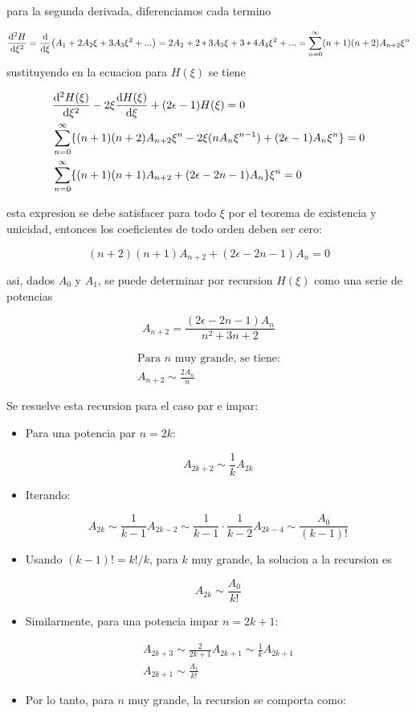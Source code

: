 \documentclass[11pt]{article}
\begin{document}
para la segunda derivada, diferenciamos cada termino

\[ \dv[2]{H}{\xi} = \dv{\xi}(A_1 + 2A_2\xi + 3A_3 \xi^2 + ... ) = 2A_2 + 2*3 A_3\xi + 3*4 A_4\xi^2 + ... = \sum_{n=0}^{\infty} (n+1)(n+2)A_{n+2} \xi^n \]
sustituyendo en la ecuacion para \(H(\xi)\) se tiene

\begin{align*}
    &\dv[2]{H(\xi)}{\xi} - 2\xi \dv{H(\xi)}{\xi} + (2\epsilon - 1)H(\xi) = 0 \\
    &\sum_{n=0}^{\infty} \{(n+1)(n+2)A_{n+2} \xi^n  - 2\xi(nA_n\xi^{n-1}) + (2\epsilon - 1)A_n\xi^n \}= 0 \\
    &\sum_{n=0}^{\infty}  \{(n+1)(n+1) A_{n+2} + (2\epsilon - 2n - 1)A_n \} \xi^n = 0
\end{align*}

esta expresion se debe satisfacer para todo \(\xi\) por el teorema de existencia y unicidad, entonces los coeficientes de todo orden deben ser cero:

\[ (n+2)(n+1)A_{n+2} + (2\epsilon - 2n -1)A_n  =0 \]

asi, dados \(A_0\) y \(A_1\), se puede determinar por recursion \(H(\xi)\) como una serie de potencias

\begin{equation}
\label{eq:rec-hermite}
     A_{n+2} = \frac{(2\epsilon - 2n -1)A_n}{n^2 + 3n + 2}
\end{equation}

\begin{gather*}
    \text{Para \(n\) muy grande, se tiene:} \\
    A_{n+2}  \sim \frac{2A_n}{n}
\end{gather*}

Se resuelve esta recursion para el caso par e impar:

\begin{itemize}
\item Para una potencia par \(n=2k\):

\[ A_{2k+2} \sim \frac{1}{k}A_{2k} \]

\item Iterando:

\[ A_{2k} \sim \frac{1}{k-1}A_{2k-2} \sim \frac{1}{k-1}\cdot \frac{1}{k-2}A_{2k-4}\sim \frac{A_0}{(k-1)!} \]

\item Usando \((k-1)! = k!/k\), para \(k\) muy grande, la solucion a la recursion es

\[ A_{2k} \sim \frac{A_0}{k!} \]

\item Similarmente, para una potencia impar \(n = 2k+1\):

\begin{gather*}
A_{2k+3} \sim \frac{2}{2k+1}A_{2k+1} \sim \frac{1}{k}A_{2k+1} \\
A_{2k+1} \sim \frac{A_1}{k!}
\end{gather*}

\item Por lo tanto, para \(n\) muy grande, la recursion se comporta como:
\end{itemize}
\end{document}
